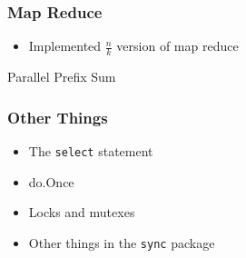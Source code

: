 \documentclass{beamer}
\begin{document}
\begin{frame}[fragile] 
\frametitle{Map Reduce}
\begin{itemize}
  \item Implemented $\frac{n}{k}$ version of map reduce
\end{itemize}
\end{frame}

\begin{frame} {Parallel Prefix Sum}
\end{frame}

\begin{frame} [fragile]
\frametitle{Other Things}
\begin{itemize}
\item The \verb=select= statement
\item do.Once
\item Locks and mutexes
\item Other things in the \verb=sync= package
\end{itemize}
\end{frame}
\end{document}
